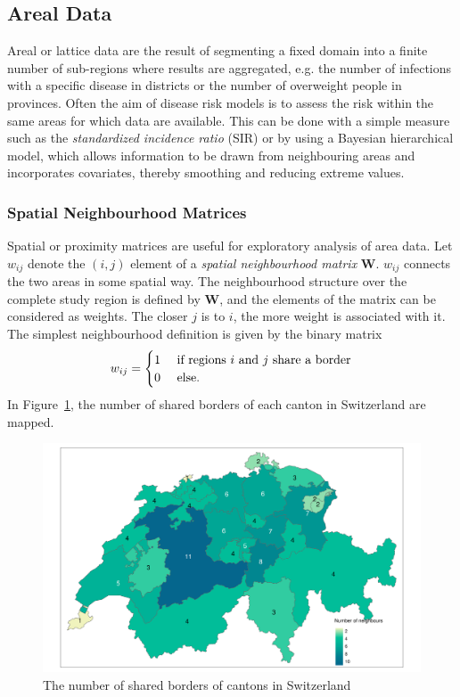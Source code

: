\subsection{Areal Data}
Areal or lattice data are the result of segmenting a fixed domain into a finite number of sub-regions where results are aggregated, e.g. the number of infections with a specific disease in districts or the number of overweight people in provinces. Often the aim of disease risk models is to assess the risk within the same areas for which data are available. This can be done with a simple measure such as the \textit{standardized incidence ratio} (SIR) or by using a Bayesian hierarchical model, which allows information to be drawn from neighbouring areas and incorporates covariates, thereby smoothing and reducing extreme values. 
\subsubsection{Spatial Neighbourhood Matrices}
Spatial or proximity matrices are useful for exploratory analysis of area data. Let $w_{ij}$ denote the $\left(i,j\right)$ element of a \textit{spatial neighbourhood matrix} $\pmb{W}$. $w_{ij}$ connects the two areas in some spatial way. The neighbourhood structure over the complete study region is defined by $\pmb{W}$, and the elements of the matrix can be considered as weights. \clearpage The closer $j$ is to $i$, the more weight is associated with it. The simplest neighbourhood definition is given by the binary matrix
\begin{equation}
    w_{ij}=\begin{cases}
    1 & \hbox{ if regions } i $\hbox{ and }$ j \hbox{ share a border} \\
    0 & \hbox{ else.}
    \end{cases}
\end{equation}
In Figure~\ref{fig:neighbour}, the number of shared borders of each canton in Switzerland are mapped.
\begin{figure}[H]
   \centering
       \includegraphics[page=1,width=\textwidth]{neighbours.pdf}
 \caption{The number of shared borders of cantons in Switzerland}
 \label{fig:neighbour}
\end{figure}
